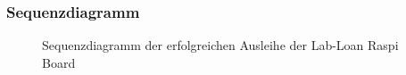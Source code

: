 \subsubsection{Sequenzdiagramm}
\label{sec:server:fsm:sequenz}
\begin{figure}
	\centering
	\caption{Sequenzdiagramm der erfolgreichen Ausleihe der Lab-Loan Raspi Board}
	\label{fig:seq}
\end{figure}
